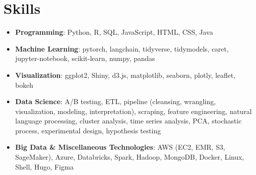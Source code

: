 \documentclass[letterpaper,10pt]{article}
\newcommand{\resumeSubHeadingListStart}{\begin{itemize}[leftmargin=*]}
\newcommand{\resumeSubHeadingListEnd}{\end{itemize}}
\begin{document}
\section{Skills}
  \resumeSubHeadingListStart
    \item\small{
      \textbf{Programming}{: Python, R, SQL, JavaScript, HTML, CSS, Java}
    }\vspace{-8pt}
    \item\small{
      \textbf{Machine Learning}{: pytorch, langchain, tidyverse, tidymodels, caret, jupyter-notebook, scikit-learn, numpy, pandas}
    }\vspace{-8pt}
    \item\small{
      \textbf{Visualization}{: ggplot2, Shiny, d3.js, matplotlib, seaborn, plotly, leaflet, bokeh}
    }\vspace{-8pt}
    \item\small{
      \textbf{Data Science}{: A/B testing, ETL, pipeline (cleansing, wrangling, visualization, modeling, interpretation), scraping, feature engineering, natural language processing, cluster analysis, time series analysis, PCA, stochastic process, experimental design, hypothesis testing}
    }\vspace{-8pt}
    \item\small{
      \textbf{Big Data \& Miscellaneous Technologies}{: AWS (EC2, EMR, S3, SageMaker), Azure, Databricks, Spark, Hadoop, MongoDB, Docker, Linux, Shell, Hugo, Figma}
    }\vspace{-8pt}
  \resumeSubHeadingListEnd

\end{document}
